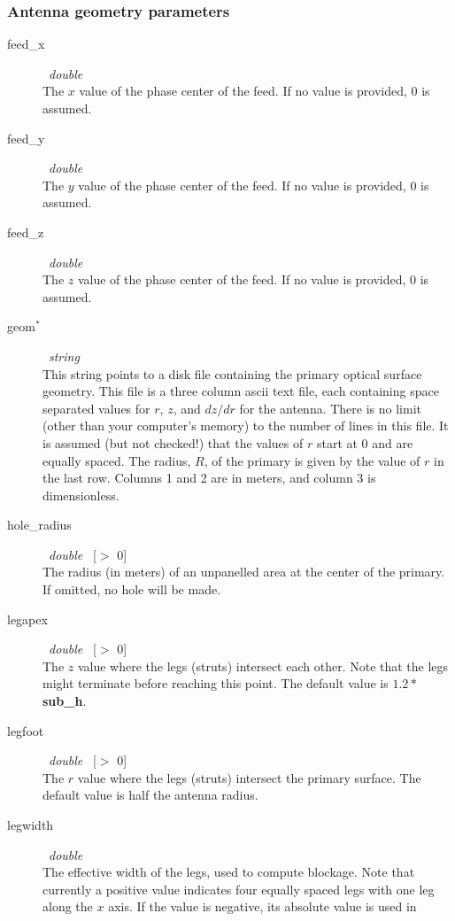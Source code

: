 \documentclass{article}
\begin{document}
\subsubsection{Antenna geometry parameters}

\begin{description}
\item[feed\_x] \ {\it double} \\
The $x$ value of the phase center of the feed.  If no value is provided, 0
is assumed.
\item[feed\_y] \ {\it double} \\
The $y$ value of the phase center of the feed.  If no value is provided, 0
is assumed.
\item[feed\_z] \ {\it double} \\
The $z$ value of the phase center of the feed.  If no value is provided, 0
is assumed.
\item[geom$^*$] \ {\it string} \\
This string points to a disk file containing the primary optical surface
geometry.  This file is a three column ascii text file, each containing
space separated values for $r$, $z$, and $dz/dr$ for the antenna.  There is no
limit (other than your computer's memory) to the number of lines in this file.
It is assumed (but not checked!) that the values of $r$ start at 0 and are
equally spaced.  The radius, $R$, of the primary is given by the value of $r$ in
the last row.  Columns 1 and 2 are in meters, and column 3 is dimensionless.
\item[hole\_radius] \ {\it double} \ [$>$ 0] \\
The radius (in meters) of an unpanelled area at the center of the primary.  If
omitted, no hole will be made.
\item[legapex] \ {\it double} \ [$>$ 0] \\
The $z$ value where the legs (struts) intersect each other.  
Note that the legs might terminate before reaching this point.  The default
value is $1.2*${\bf sub\_h}.
\item[legfoot] \ {\it double} \ [$>$ 0] \\ 
The $r$ value where the legs (struts) intersect the primary surface.  The
default value is half the antenna radius.
\item[legwidth] \ {\it double} \\
The effective width of the legs, used to compute blockage.  Note that currently
a positive value indicates four equally spaced legs with one leg along the
$x$ axis.  If the value is negative, its absolute value is used in

\end{description}
\end{document}
